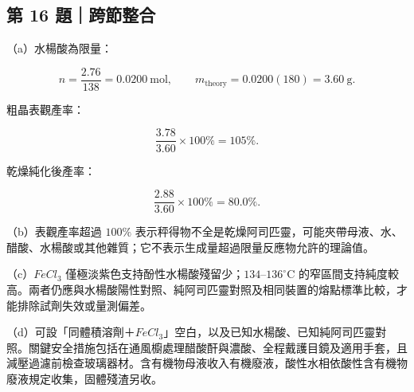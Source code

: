 \documentclass[11pt,a4paper]{article}
\begin{document}
\subsection{第 16 題｜跨節整合}\label{ux7b2c-16-ux984cux8de8ux7bc0ux6574ux5408}

（a）水楊酸為限量：

\[
n=\frac{2.76}{138}=0.0200\ \mathrm{mol},
\qquad
m_{\mathrm{theory}}=0.0200(180)=3.60\ \mathrm g.
\]

粗晶表觀產率：

\[
\frac{3.78}{3.60}\times100\%=105\%.
\]

乾燥純化後產率：

\[
\frac{2.88}{3.60}\times100\%=80.0\%.
\]

（b）表觀產率超過 \(100\%\) 表示秤得物不全是乾燥阿司匹靈，可能夾帶母液、水、醋酸、水楊酸或其他雜質；它不表示生成量超過限量反應物允許的理論值。

（c）\(FeCl_3\) 僅極淡紫色支持酚性水楊酸殘留少；\(134\)--\(136^\circ\mathrm C\) 的窄區間支持純度較高。兩者仍應與水楊酸陽性對照、純阿司匹靈對照及相同裝置的熔點標準比較，才能排除試劑失效或量測偏差。

（d）可設「同體積溶劑＋\(FeCl_3\)」空白，以及已知水楊酸、已知純阿司匹靈對照。關鍵安全措施包括在通風櫥處理醋酸酐與濃酸、全程戴護目鏡及適用手套，且減壓過濾前檢查玻璃器材。含有機物母液收入有機廢液，酸性水相依酸性含有機物廢液規定收集，固體殘渣另收。
\end{document}
